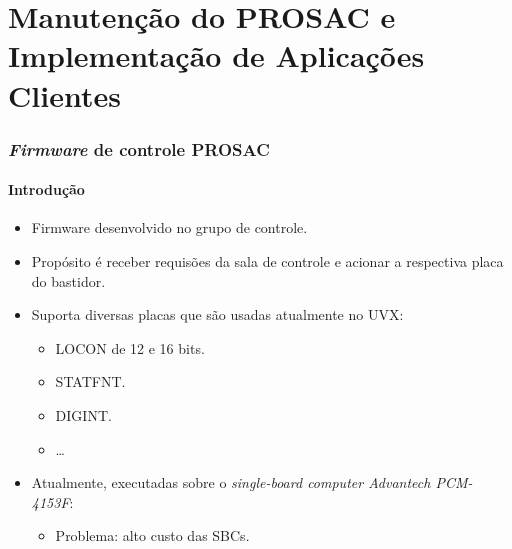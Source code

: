 \documentclass{beamer}
\begin{document}
\section {Manutenção do PROSAC e Implementação de Aplicações Clientes}

\begin{frame}
\frametitle {\textit{Firmware} de controle PROSAC}
\framesubtitle{Introdução}

\begin{itemize}
  \item Firmware desenvolvido no grupo de controle.
  \item Propósito é receber requisões da sala de controle e acionar a respectiva placa do bastidor. 
  \item Suporta diversas placas que são usadas atualmente no UVX:
  \begin{itemize}
    \item LOCON de 12 e 16 bits.
    \item STATFNT.
    \item DIGINT.
    \item \ldots
   \end{itemize}
   \item Atualmente, executadas sobre o \textit{single-board computer Advantech
   PCM-4153F}:
   \begin{itemize} 
   		\item Problema: alto custo das SBCs.
   \end{itemize} 
\end{itemize}

\end{frame}

\end{document}
